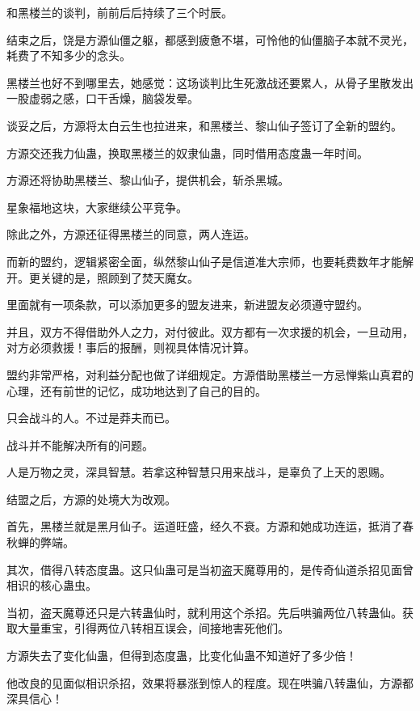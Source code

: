 
\begin{this_body}



和黑楼兰的谈判，前前后后持续了三个时辰。

结束之后，饶是方源仙僵之躯，都感到疲惫不堪，可怜他的仙僵脑子本就不灵光，耗费了不知多少的念头。

黑楼兰也好不到哪里去，她感觉：这场谈判比生死激战还要累人，从骨子里散发出一股虚弱之感，口干舌燥，脑袋发晕。

谈妥之后，方源将太白云生也拉进来，和黑楼兰、黎山仙子签订了全新的盟约。

方源交还我力仙蛊，换取黑楼兰的奴隶仙蛊，同时借用态度蛊一年时间。

方源还将协助黑楼兰、黎山仙子，提供机会，斩杀黑城。

星象福地这块，大家继续公平竞争。

除此之外，方源还征得黑楼兰的同意，两人连运。

而新的盟约，逻辑紧密全面，纵然黎山仙子是信道准大宗师，也要耗费数年才能解开。更关键的是，照顾到了焚天魔女。

里面就有一项条款，可以添加更多的盟友进来，新进盟友必须遵守盟约。

并且，双方不得借助外人之力，对付彼此。双方都有一次求援的机会，一旦动用，对方必须救援！事后的报酬，则视具体情况计算。

盟约非常严格，对利益分配也做了详细规定。方源借助黑楼兰一方忌惮紫山真君的心理，还有前世的记忆，成功地达到了自己的目的。

只会战斗的人。不过是莽夫而已。

战斗并不能解决所有的问题。

人是万物之灵，深具智慧。若拿这种智慧只用来战斗，是辜负了上天的恩赐。

结盟之后，方源的处境大为改观。

首先，黑楼兰就是黑月仙子。运道旺盛，经久不衰。方源和她成功连运，抵消了春秋蝉的弊端。

其次，借得八转态度蛊。这只仙蛊可是当初盗天魔尊用的，是传奇仙道杀招见面曾相识的核心蛊虫。

当初，盗天魔尊还只是六转蛊仙时，就利用这个杀招。先后哄骗两位八转蛊仙。获取大量重宝，引得两位八转相互误会，间接地害死他们。

方源失去了变化仙蛊，但得到态度蛊，比变化仙蛊不知道好了多少倍！

他改良的见面似相识杀招，效果将暴涨到惊人的程度。现在哄骗八转蛊仙，方源都深具信心！


\end{this_body}
